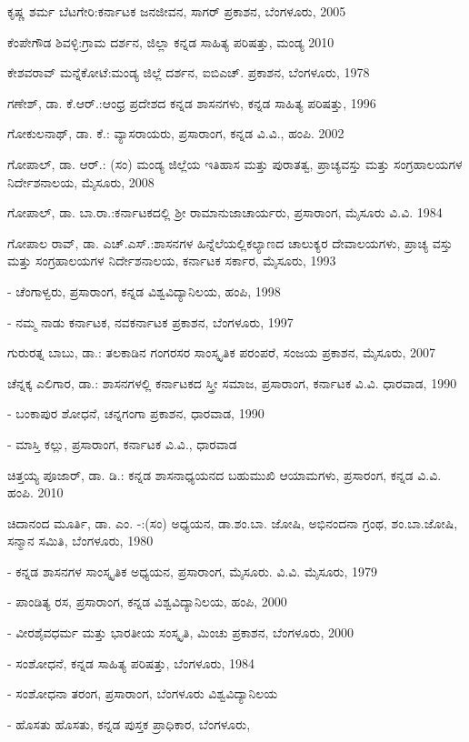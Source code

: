 \noindent
ಕೃಷ್ಣ ಶರ್ಮ ಬೆಟಗೇರಿ:ಕರ್ನಾಟಕ ಜನಜೀವನ, ಸಾಗರ್​ ಪ್ರಕಾಶನ, ಬೆಂಗಳೂರು, 2005

\noindent
ಕೆಂಪೇಗೌಡ ಶಿವಳ್ಳಿ:ಗ್ರಾಮ ದರ್ಶನ, ಜಿಲ್ಲಾ ಕನ್ನಡ ಸಾಹಿತ್ಯ ಪರಿಷತ್ತು, ಮಂಡ್ಯ 2010

\noindent
ಕೇಶವರಾವ್​ ಮನ್ನೆಕೋಟೆ:ಮಂಡ್ಯ ಜಿಲ್ಲೆ ದರ್ಶನ, ಐಬಿಎಚ್​. ಪ್ರಕಾಶನ, ಬೆಂಗಳೂರು, 1978

\noindent
ಗಣೇಶ್​, ಡಾ. ಕೆ.ಆರ್​.:ಆಂಧ್ರ ಪ್ರದೇಶದ ಕನ್ನಡ ಶಾಸನಗಳು, ಕನ್ನಡ ಸಾಹಿತ್ಯ ಪರಿಷತ್ತು, 1996

\noindent
ಗೋಕುಲನಾಥ್​, ಡಾ. ಕೆ.: ವ್ಯಾಸರಾಯರು, ಪ್ರಸಾರಾಂಗ, ಕನ್ನಡ ವಿ.ವಿ., ಹಂಪಿ. 2002

\noindent
ಗೋಪಾಲ್​, ಡಾ. ಆರ್​.: (ಸಂ) ಮಂಡ್ಯ ಜಿಲ್ಲೆಯ ಇತಿಹಾಸ ಮತ್ತು ಪುರಾತತ್ವ, ಪ್ರಾಚ್ಯವಸ್ತು ಮತ್ತು ಸಂಗ್ರಹಾಲಯಗಳ ನಿರ್ದೇಶನಾಲಯ, ಮೈಸೂರು, 2008

\noindent
ಗೋಪಾಲ್​, ಡಾ. ಬಾ.ರಾ.:ಕರ್ನಾಟಕದಲ್ಲಿ ಶ‍್ರೀ ರಾಮಾನುಜಾಚಾರ್ಯರು, ಪ್ರಸಾರಾಂಗ, ಮೈಸೂರು ವಿ.ವಿ. 1984

\noindent
ಗೋಪಾಲ ರಾವ್​, ಡಾ. ಎಚ್​.ಎಸ್​.:ಶಾಸನಗಳ ಹಿನ್ನೆಲೆಯಲ್ಲಿಕಲ್ಯಾಣದ ಚಾಲುಕ್ಯರ ದೇವಾಲಯಗಳು, ಪ್ರಾಚ್ಯ ವಸ್ತು ಮತ್ತು ಸಂಗ್ರಹಾಲಯಗಳ ನಿರ್ದೇಶನಾಲಯ, ಕರ್ನಾಟಕ ಸರ್ಕಾರ, ಮೈಸೂರು, 1993

- ಚೆಂಗಾಳ್ವರು, ಪ್ರಸಾರಾಂಗ, ಕನ್ನಡ ವಿಶ್ವವಿದ್ಯಾನಿಲಯ, ಹಂಪಿ, 1998

- ನಮ್ಮ ನಾಡು ಕರ್ನಾಟಕ, ನವಕರ್ನಾಟಕ ಪ್ರಕಾಶನ, ಬೆಂಗಳೂರು, 1997

\noindent
ಗುರುರತ್ನ ಬಾಬು, ಡಾ.: ತಲಕಾಡಿನ ಗಂಗರಸರ ಸಾಂಸ್ಕೃತಿಕ ಪರಂಪರೆ, ಸಂಜಯ ಪ್ರಕಾಶನ, ಮೈಸೂರು, 2007

\noindent
ಚೆನ್ನಕ್ಕ ಎಲಿಗಾರ, ಡಾ.: ಶಾಸನಗಳಲ್ಲಿ ಕರ್ನಾಟಕದ ಸ್ತ್ರೀ ಸಮಾಜ, ಪ್ರಸಾರಾಂಗ, ಕರ್ನಾಟಕ ವಿ.ವಿ. ಧಾರವಾಡ, 1990

- ಬಂಕಾಪುರ ಶೋಧನೆ, ಚನ್ನಗಂಗಾ ಪ್ರಕಾಶನ, ಧಾರವಾಡ, 1990

- ಮಾಸ್ತಿ ಕಲ್ಲು, ಪ್ರಸಾರಾಂಗ, ಕರ್ನಾಟಕ ವಿ.ವಿ., ಧಾರವಾಡ

\noindent
ಚಿತ್ತಯ್ಯ ಪೂಜಾರ್​, ಡಾ. ಡಿ.: ಕನ್ನಡ ಶಾಸನಾಧ್ಯಯನದ ಬಹುಮುಖಿ ಆಯಾಮಗಳು, ಪ್ರಸಾರಂಗ, ಕನ್ನಡ ವಿ.ವಿ. ಹಂಪಿ. 2010

\noindent
ಚಿದಾನಂದ ಮೂರ್ತಿ, ಡಾ. ಎಂ. -:(ಸಂ) ಅಧ್ಯಯನ, ಡಾ.ಶಂ.ಬಾ. ಜೋಷಿ, ಅಭಿನಂದನಾ ಗ್ರಂಥ, ಶಂ.ಬಾ.ಜೋಷಿ, ಸನ್ಮಾನ ಸಮಿತಿ, ಬೆಂಗಳೂರು, 1980

- ಕನ್ನಡ ಶಾಸನಗಳ ಸಾಂಸ್ಕೃತಿಕ ಅಧ್ಯಯನ, ಪ್ರಸಾರಾಂಗ, ಮೈಸೂರು. ವಿ.ವಿ. ಮೈಸೂರು, 1979

- ಪಾಂಡಿತ್ಯ ರಸ, ಪ್ರಸಾರಾಂಗ, ಕನ್ನಡ ವಿಶ್ವವಿದ್ಯಾನಿಲಯ, ಹಂಪಿ, 2000

- ವೀರಶೈವಧರ್ಮ ಮತ್ತು ಭಾರತೀಯ ಸಂಸ್ಕೃತಿ, ಮಿಂಚು ಪ್ರಕಾಶನ, ಬೆಂಗಳೂರು, 2000

- ಸಂಶೋಧನೆ, ಕನ್ನಡ ಸಾಹಿತ್ಯ ಪರಿಷತ್ತು, ಬೆಂಗಳೂರು, 1984

- ಸಂಶೋಧನಾ ತರಂಗ, ಪ್ರಸಾರಾಂಗ, ಬೆಂಗಳೂರು ವಿಶ್ವವಿದ್ಯಾನಿಲಯ

- ಹೊಸತು ಹೊಸತು, ಕನ್ನಡ ಪುಸ್ತಕ ಪ್ರಾಧಿಕಾರ, ಬೆಂಗಳೂರು,

